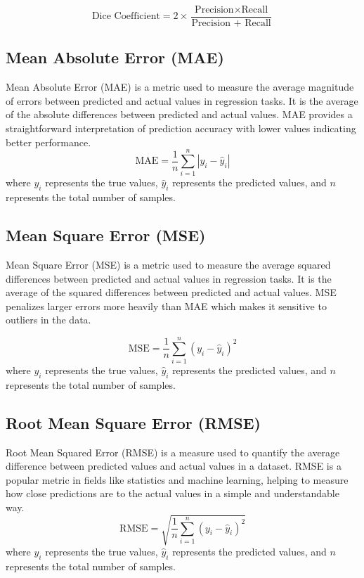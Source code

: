 \begin{equation}
\text{Dice Coefficient} = 2 \times \frac{\text{Precision} \times \text{Recall}}{\text{Precision + Recall}}
\end{equation}

   

\subsection{Mean Absolute Error (MAE)}
Mean Absolute Error (MAE) is a metric used to measure the average magnitude of errors between predicted and actual values in regression tasks. It is the average of the absolute differences between predicted and actual values. MAE provides a straightforward interpretation of prediction accuracy with lower values indicating better performance.
\begin{equation}
\text{MAE} = \frac{1}{n} \sum_{i=1}^{n} |y_i - \hat{y}_i|
\end{equation}
where $y_i$ represents the true values, $\hat{y}_i$ represents the predicted values, and $n$ represents the total number of samples.

\subsection{Mean Square Error (MSE)}
Mean Square Error (MSE) is a metric used to measure the average squared differences between predicted and actual values in regression tasks. It is the average of the squared differences between predicted and actual values. MSE penalizes larger errors more heavily than MAE which makes it sensitive to outliers in the data.

\begin{equation}
\text{MSE} = \frac{1}{n} \sum_{i=1}^{n} (y_i - \hat{y}_i)^2
\end{equation}
where $y_i$ represents the true values, $\hat{y}_i$ represents the predicted values, and $n$ represents the total number of samples.
\subsection{Root Mean Square Error (RMSE)}
Root Mean Squared Error (RMSE) is a measure used to quantify the average difference between predicted values and actual values in a dataset. RMSE is a popular metric in fields like statistics and machine learning, helping to measure how close predictions are to the actual values in a simple and understandable way.
\begin{equation}
\text{RMSE} = \sqrt{\frac{1}{n} \sum_{i=1}^{n} (y_i - \hat{y}_i)^2}
\end{equation}
where $y_i$ represents the true values, $\hat{y}_i$ represents the predicted values, and $n$ represents the total number of samples.


